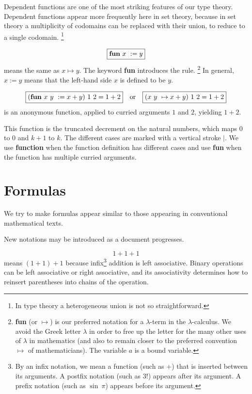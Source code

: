 \documentclass[12pt]{article}
\numberwithin{definition}{section}
\begin{document}
Dependent functions are one of the most striking features of our type
theory.  Dependent functions appear more frequently here in set
theory, because in set theory a multiplicity of codomains can be
replaced with their union, to reduce to a single codomain.%
\footnote{In type theory a heterogeneous union is not so
  straightforward.}

\[
\boxed{\text{\bf fun}\ x\ := y}
\]
means the same as $x\mapsto y$.  The keyword {\bf fun} introduces the
rule.%
\footnote{{\bf fun} (or $\mapsto$) is our preferred notation for a
  $\lambda$-term in the $\lambda$-calculus.  We avoid the Greek letter
  $\lambda$ in order to free up the letter for the many other uses of
  $\lambda$ in mathematics (and also to remain closer to the preferred
  convention $\mapsto$ of mathematicians).  The variable $a$ is a
  bound variable.}  In general, $x := y$ means that the left-hand side
$x$ is defined to be $y$.

\[
\boxed{(\text{\bf fun}\ x\ y\ := x + y)\ 1\ 2 = 1+2}\quad\text{or}\quad
\boxed{(x\ y\ \mapsto x+y)\ 1\ 2 = 1+2}
\]
is an anonymous 
function, applied to curried arguments $1$ and $2$, yielding $1+2$.



\begin{center}
\end{center}
This function is the truncated decrement on the natural numbers, which maps $0$ to $0$
and $k+1$ to $k$.   The different cases are marked with a vertical stroke $|$.
We use {\bf function} when the function definition has different cases
and use {\bf fun} when the function has multiple curried arguments.


\section{Formulas}

We try to make formulas appear similar to those appearing
in conventional mathematical texts.

New notations may be introduced as a document progresses.

\[
\boxed{1 + 1 + 1}
\]
means $(1+1)+1$ because infix\footnote{By an infix notation,
we mean a function (such as $+$) that is inserted between its
arguments.  A postfix notation (such as $3!$) appears after
its argument. A prefix notation (such as $\sin\ \pi$) appears before
its argument.} addition is left associative.  Binary
operations can be left associative or right associative, and its
associativity determines how to reinsert parentheses into chains of
the operation.
\end{document}
